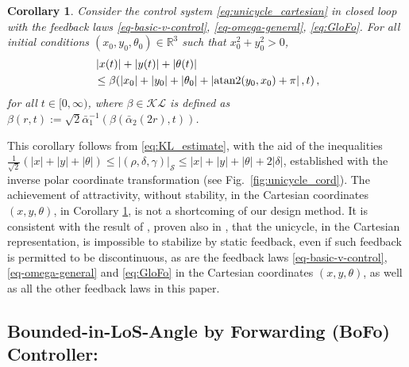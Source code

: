 \documentclass[letterpaper, 10 pt, conference]{ieeeconf}  %
\newtheorem{corollary}{Corollary}
\newcommand{\abs}[1]{\left\lvert#1\right\rvert}
\begin{document}
\begin{corollary}
\label{cor-attractivity}
\textit Consider the control system 
\eqref{eq:unicycle_cartesian} in closed loop with the feedback laws \eqref{eq-basic-v-control}, \eqref{eq-omega-general},  \eqref{eq:GloFo}.
For all initial conditions $(x_0,y_0,\theta_0)\in\mathbb{R}^3$ such that $x_0^2 + y_0^2>0$, 
\begin{align}
&\abs{x(t)} + \abs{y(t)} + \abs{\theta(t)}\nonumber\\
&\le  {\beta}(\abs{x_0} + \abs{y_0} + \abs{\theta_0}  + \abs{{\rm atan2}(y_0,x_0) + \pi},t)\,,  \label{eq:KL-estimate_xytheta}
\end{align}
for all $t\in[0,\infty)$, where $\beta\in\mathcal{KL}$  is defined as  $\beta(r,t) := \sqrt{2}\bar{\alpha}_1^{-1}(\beta( \bar{\alpha}_2(2 r),t))$.
\end{corollary}

This corollary follows from \eqref{eq:KL_estimate}, with the aid of the inequalities 
$\frac{1}{\sqrt{2}} (\abs{x} + \abs{y} + \abs{\theta}) \le \abs{(\rho,\delta,\gamma)}_{\mathcal{S}} \le \abs{x} + \abs{y} + \abs{\theta}  + 2\abs{\delta}$,  established with the inverse polar coordinate transformation (see Fig.~\ref{fig:unicycle_cord}).
The achievement of attractivity, without stability, in the Cartesian coordinates $(x,y,\theta)$, in Corollary \ref{cor-attractivity}, is not a shortcoming of our design method. It is consistent with the result of \cite[Remark 1.6]{coron1994relation}, proven also in \cite[pg. 43]{praly2022fonctions}, that the unicycle, in the Cartesian representation, is impossible to stabilize by static feedback, even if such feedback is permitted to be discontinuous, as are the feedback laws \eqref{eq-basic-v-control}, \eqref{eq-omega-general} and  \eqref{eq:GloFo} in the Cartesian coordinates $(x,y,\theta)$, as well as all the other feedback laws in this paper. 
\subsection{Bounded-in-LoS-Angle by Forwarding (BoFo) Controller:}
\end{document}
